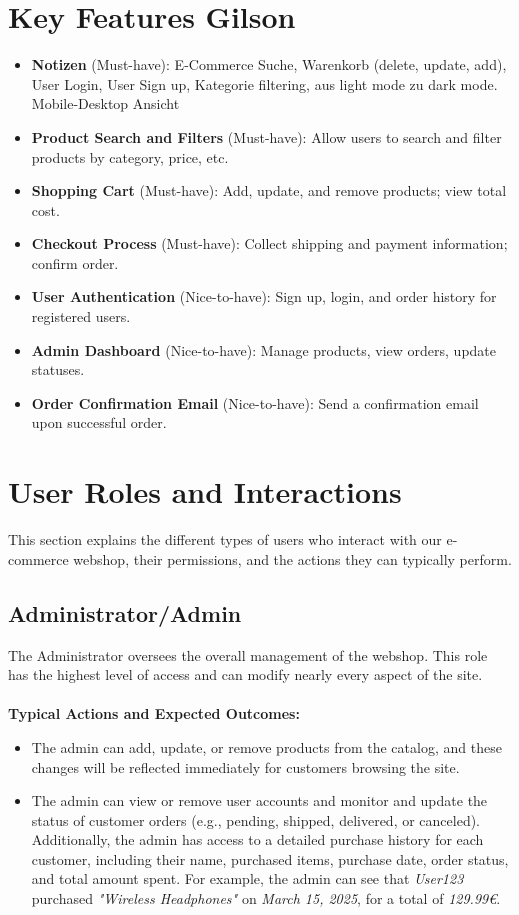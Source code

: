 \documentclass[a4paper,12pt]{article}
\begin{document}
	\section{Key Features Gilson}
	\begin{itemize}
		\item \textbf{Notizen} (Must-have): E-Commerce
		Suche, Warenkorb (delete, update, add), User Login, User Sign up, Kategorie filtering, aus light mode zu dark mode. Mobile-Desktop Ansicht
		\item \textbf{Product Search and Filters} (Must-have): Allow users to search and filter products by category, price, etc.
		\item \textbf{Shopping Cart} (Must-have): Add, update, and remove products; view total cost.
		\item \textbf{Checkout Process} (Must-have): Collect shipping and payment information; confirm order.
		\item \textbf{User Authentication} (Nice-to-have): Sign up, login, and order history for registered users.
		\item \textbf{Admin Dashboard} (Nice-to-have): Manage products, view orders, update statuses.
		\item \textbf{Order Confirmation Email} (Nice-to-have): Send a confirmation email upon successful order.
	\end{itemize}
	

	\section{User Roles and Interactions}
	This section explains the different types of users who interact with our e-commerce webshop, their permissions, and the actions they can typically perform.
	\subsection*{Administrator/Admin}
	The Administrator oversees the overall management of the webshop. This role has the highest level of access and can modify nearly every aspect of the site. \\ \\
	\textbf{Typical Actions and Expected Outcomes:}
	\begin{itemize}
		\item The admin can add, update, or remove products from the catalog, and these changes will be reflected immediately for customers browsing the site.
		\item The admin can view or remove user accounts and monitor and update the status of customer orders (e.g., pending, shipped, delivered, or canceled). Additionally, the admin has access to a detailed purchase history for each customer, including their name, purchased items, purchase date, order status, and total amount spent. For example, the admin can see that \textit{User123} purchased  \textit{"Wireless Headphones"} on \textit{March 15, 2025}, for a total of \textit{129.99€}.
	\end{itemize}
\end{document}
